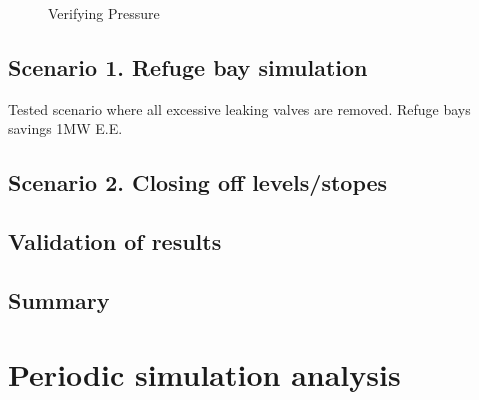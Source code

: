 	\begin{figure}[h]
		\centering
		\fbox{}
		\caption{Verifying Pressure}
		\label{fig: Verification Pressure kusasalethu Setpoint}
	\end{figure}
	
	\subsection{Scenario 1. Refuge bay simulation}
	Tested scenario where all excessive leaking valves are removed.
	Refuge bays savings 1MW E.E.
	
	\subsection{Scenario 2. Closing off levels/stopes}
	
	\subsection{Validation of results}
	\subsection{Summary}
	
\section{Periodic simulation analysis}
